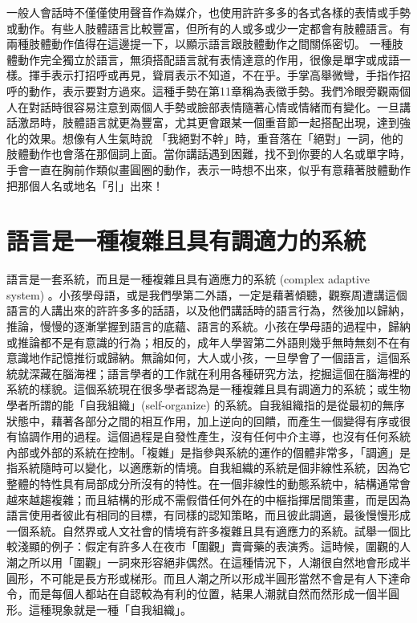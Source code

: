一般人會話時不僅僅使用聲音作為媒介，也使用許許多多的各式各樣的表情或手勢或動作。有些人肢體語言比較豐富，但所有的人或多或少一定都會有肢體語言。有兩種肢體動作值得在這邊提一下，以顯示語言跟肢體動作之間關係密切。 一種肢體動作完全獨立於語言，無須搭配語言就有表情達意的作用，很像是單字或成語一 樣。揮手表示打招呼或再見，聳肩表示不知道，不在乎。手掌高舉微彎，手指作招呼的動作，表示要對方過來。這種手勢在第11章稱為表徵手勢。我們冷眼旁觀兩個人在對話時很容易注意到兩個人手勢或臉部表情隨著心情或情緒而有變化。一旦講話激昂時，肢體語言就更為豐富，尤其更會跟某一個重音節一起搭配出現，達到強化的效果。想像有人生氣時說 「我絕對不幹」時，重音落在「絕對」一詞，他的肢體動作也會落在那個詞上面。當你講話遇到困難，找不到你要的人名或單字時，手會一直在胸前作類似畫圓圈的動作，表示一時想不出來，似乎有意藉著肢體動作把那個人名或地名「引」出來！

\section{語言是一種複雜且具有調適力的系統}

語言是一套系統，而且是一種複雜且具有適應力的系統 (complex adaptive system) \citep{BecknerEtAl2009}。小孩學母語，或是我們學第二外語，一定是藉著傾聽，觀察周遭講這個語言的人講出來的許許多多的話語，以及他們講話時的語言行為，然後加以歸納，推論，慢慢的逐漸掌握到語言的底蘊、語言的系統。小孩在學母語的過程中，歸納或推論都不是有意識的行為；相反的，成年人學習第二外語則幾乎無時無刻不在有意識地作記憶推衍或歸納。無論如何，大人或小孩，一旦學會了一個語言，這個系統就深藏在腦海裡；語言學者的工作就在利用各種研究方法，挖掘這個在腦海裡的系統的樣貌。這個系統現在很多學者認為是一種複雜且具有調適力的系統；或生物學者所謂的能「自我組織」(self-organize) 的系統。自我組織指的是從最初的無序狀態中，藉著各部分之間的相互作用，加上逆向的回饋，而產生一個變得有序或很有協調作用的過程。這個過程是自發性產生，沒有任何中介主導，也沒有任何系統內部或外部的系統在控制。「複雜」是指參與系統的運作的個體非常多，「調適」是指系統隨時可以變化，以適應新的情境。自我組織的系統是個非線性系統，因為它整體的特性具有局部成分所沒有的特性。在一個非線性的動態系統中，結構通常會越來越趨複雜；而且結構的形成不需假借任何外在的中樞指揮居間策畫，而是因為語言使用者彼此有相同的目標，有同樣的認知策略，而且彼此調適，最後慢慢形成一個系統。自然界或人文社會的情境有許多複雜且具有適應力的系統。試舉一個比較淺顯的例子：假定有許多人在夜市「圍觀」賣膏藥的表演秀。這時候，圍觀的人潮之所以用「圍觀」一詞來形容絕非偶然。在這種情況下，人潮很自然地會形成半圓形，不可能是長方形或梯形。而且人潮之所以形成半圓形當然不會是有人下達命令，而是每個人都站在自認較為有利的位置，結果人潮就自然而然形成一個半圓形。這種現象就是一種「自我組織」。

